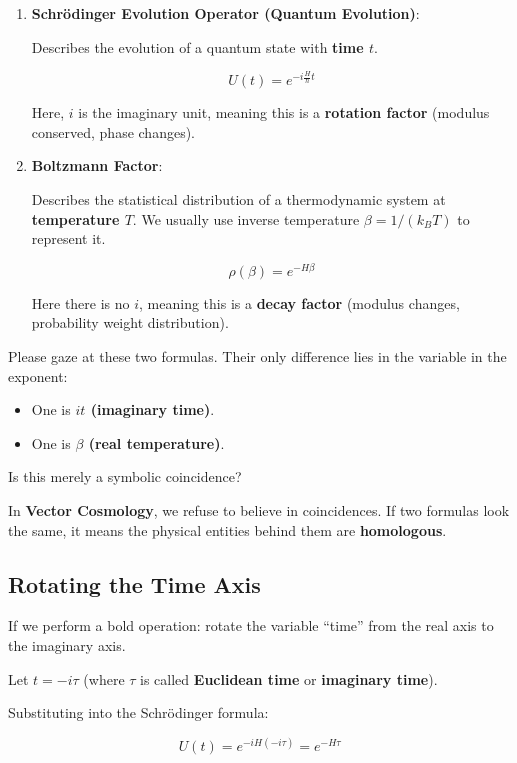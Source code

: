 \documentclass[11pt,a4paper,twoside]{book}
\begin{document}
\begin{enumerate}
\item \textbf{Schrödinger Evolution Operator (Quantum Evolution)}:

    Describes the evolution of a quantum state with \textbf{time $t$}.

    $$U(t) = e^{-i \frac{H}{\hbar} t}$$

    Here, $i$ is the imaginary unit, meaning this is a \textbf{rotation factor} (modulus conserved, phase changes).

\item \textbf{Boltzmann Factor}:

    Describes the statistical distribution of a thermodynamic system at \textbf{temperature $T$}. We usually use inverse temperature $\beta = 1/(k_B T)$ to represent it.

    $$\rho(\beta) = e^{- H \beta}$$

    Here there is no $i$, meaning this is a \textbf{decay factor} (modulus changes, probability weight distribution).
\end{enumerate}

Please gaze at these two formulas. Their only difference lies in the variable in the exponent:

\begin{itemize}
\item One is \textbf{$it$ (imaginary time)}.

\item One is \textbf{$\beta$ (real temperature)}.
\end{itemize}

Is this merely a symbolic coincidence?

In \textbf{Vector Cosmology}, we refuse to believe in coincidences. If two formulas look the same, it means the physical entities behind them are \textbf{homologous}.

\subsection{Rotating the Time Axis}

If we perform a bold operation: rotate the variable ``time'' from the real axis to the imaginary axis.

Let $t = -i \tau$ (where $\tau$ is called \textbf{Euclidean time} or \textbf{imaginary time}).

Substituting into the Schrödinger formula:

$$U(t) = e^{-i H (-i \tau)} = e^{-H \tau}$$
\end{document}
